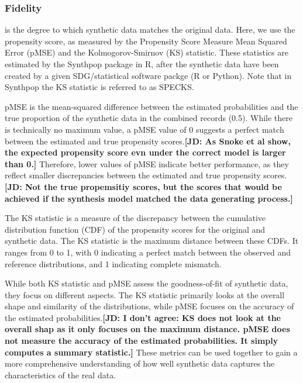 \documentclass[runningheads]{llncs}
\newcommand{\jd}[1]{\scriptsize {\bf \color{red}[JD: #1]}\normalsize}
\begin{document}
\subsubsection{Fidelity} is the degree to which synthetic data matches the original data.  Here, we use the propensity score, as measured by the Propensity Score Measure Mean Squared Error (pMSE) and the Kolmogorov-Smirnov (KS) statistic.  These statistics are estimated by the Synthpop package in R, after the synthetic data have been created by a given SDG/statistical software packge (R or Python).  Note that in Synthpop the KS statistic is referred to as SPECKS. 

pMSE is the mean-squared difference between the estimated probabilities and the true proportion of the synthetic data in the combined records (0.5).  While there is technically no maximum value, a pMSE value of 0 suggests a perfect match between the estimated and true propensity scores.\jd{As Snoke et al show, the expected propensity score evn under the correct model is larger than 0.}  Therefore, lower values of pMSE indicate better performance, as they reflect smaller discrepancies between the estimated and true propensity scores.\jd{Not the true propemsitiy scores, but the scores that would be achieved if the synthesis model matched the data generating process.}  

The KS statistic is a measure of the discrepancy between the cumulative distribution function (CDF) of the propensity scores for the original and synthetic data.  The KS statistic is the maximum distance between these CDFs. It ranges from 0 to 1, with 0 indicating a perfect match between the observed and reference distributions, and 1 indicating complete mismatch.  

While both KS statistic and pMSE assess the goodness-of-fit of synthetic data, they focus on different aspects. The KS statistic primarily looks at the overall shape and similarity of the distributions, while pMSE focuses on the accuracy of the estimated probabilities.\jd{I don't agree: KS does not look at the overall shap as it only focuses on the maximum distance. pMSE does not measure the accuracy of the estimated probabilities. It simply computes a summary statistic.} These metrics can be used together to gain a more comprehensive understanding of how well synthetic data captures the characteristics of the real data.
\end{document}
